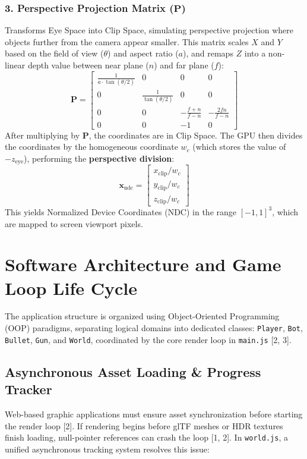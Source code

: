 \documentclass[11pt,a4paper,oneside]{article}
\begin{document}
\subsubsection{3. Perspective Projection Matrix (\texorpdfstring{$\mathbf{P}$}{P})}
Transforms Eye Space into Clip Space, simulating perspective projection where objects further from the camera appear smaller. This matrix scales $X$ and $Y$ based on the field of view ($\theta$) and aspect ratio ($a$), and remaps $Z$ into a non-linear depth value between near plane ($n$) and far plane ($f$):
\begin{equation}
    \mathbf{P} = \begin{bmatrix} 
    \frac{1}{a \cdot \tan(\theta/2)} & 0 & 0 & 0 \\ 
    0 & \frac{1}{\tan(\theta/2)} & 0 & 0 \\ 
    0 & 0 & -\frac{f+n}{f-n} & -\frac{2fn}{f-n} \\ 
    0 & 0 & -1 & 0 
    \end{bmatrix}
\end{equation}
After multiplying by $\mathbf{P}$, the coordinates are in Clip Space. The GPU then divides the coordinates by the homogeneous coordinate $w_c$ (which stores the value of $-z_{\text{eye}}$), performing the \textbf{perspective division}:
\begin{equation}
    \mathbf{x}_{\text{ndc}} = \begin{bmatrix} x_{\text{clip}}/w_c \\ y_{\text{clip}}/w_c \\ z_{\text{clip}}/w_c \end{bmatrix}
\end{equation}
This yields Normalized Device Coordinates (NDC) in the range $[-1, 1]^3$, which are mapped to screen viewport pixels.

\newpage
\section{Software Architecture and Game Loop Life Cycle}
The application structure is organized using Object-Oriented Programming (OOP) paradigms, separating logical domains into dedicated classes: \texttt{Player}, \texttt{Bot}, \texttt{Bullet}, \texttt{Gun}, and \texttt{World}, coordinated by the core render loop in \texttt{main.js} [2, 3].

\subsection{Asynchronous Asset Loading \& Progress Tracker}
Web-based graphic applications must ensure asset synchronization before starting the render loop [2]. If rendering begins before glTF meshes or HDR textures finish loading, null-pointer references can crash the loop [1, 2]. In \texttt{world.js}, a unified asynchronous tracking system resolves this issue:
\end{document}
